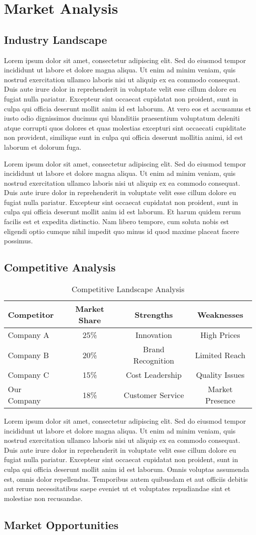 \documentclass[11pt,a4paper]{article}
\newcommand{\loremtext}[1]{%
  Lorem ipsum dolor sit amet, consectetur adipiscing elit. Sed do eiusmod tempor incididunt ut labore et dolore magna aliqua. Ut enim ad minim veniam, quis nostrud exercitation ullamco laboris nisi ut aliquip ex ea commodo consequat. Duis aute irure dolor in reprehenderit in voluptate velit esse cillum dolore eu fugiat nulla pariatur. Excepteur sint occaecat cupidatat non proident, sunt in culpa qui officia deserunt mollit anim id est laborum.%
}
\begin{document}
\section{Market Analysis}

\subsection{Industry Landscape}

\loremtext{3} At vero eos et accusamus et iusto odio dignissimos ducimus qui blanditiis praesentium voluptatum deleniti atque corrupti quos dolores et quas molestias excepturi sint occaecati cupiditate non provident, similique sunt in culpa qui officia deserunt mollitia animi, id est laborum et dolorum fuga.

\loremtext{4} Et harum quidem rerum facilis est et expedita distinctio. Nam libero tempore, cum soluta nobis est eligendi optio cumque nihil impedit quo minus id quod maxime placeat facere possimus.

\subsection{Competitive Analysis}

\begin{table}[h]
\centering
\begin{tabular}{|l|c|c|c|}
\hline
\textbf{Competitor} & \textbf{Market Share} & \textbf{Strengths} & \textbf{Weaknesses} \\
\hline
Company A & 25\% & Innovation & High Prices \\
\hline
Company B & 20\% & Brand Recognition & Limited Reach \\
\hline
Company C & 15\% & Cost Leadership & Quality Issues \\
\hline
Our Company & 18\% & Customer Service & Market Presence \\
\hline
\end{tabular}
\caption{Competitive Landscape Analysis}
\end{table}

\loremtext{5} Omnis voluptas assumenda est, omnis dolor repellendus. Temporibus autem quibusdam et aut officiis debitis aut rerum necessitatibus saepe eveniet ut et voluptates repudiandae sint et molestiae non recusandae.

\subsection{Market Opportunities}
\end{document}
